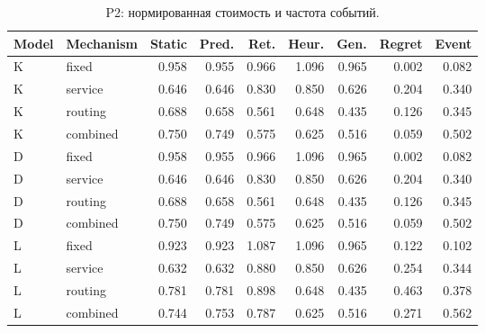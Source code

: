 \begin{table}[htbp]\caption{P2: нормированная стоимость и частота событий.}\centering\small\setlength{\tabcolsep}{3pt}

\begin{tabular}{llrrrrrrr}\toprule

Model & Mechanism & Static & Pred. & Ret. & Heur. & Gen. & Regret & Event\\\midrule

K & fixed & 0.958 & 0.955 & 0.966 & 1.096 & 0.965 & 0.002 & 0.082\\

K & service & 0.646 & 0.646 & 0.830 & 0.850 & 0.626 & 0.204 & 0.340\\

K & routing & 0.688 & 0.658 & 0.561 & 0.648 & 0.435 & 0.126 & 0.345\\

K & combined & 0.750 & 0.749 & 0.575 & 0.625 & 0.516 & 0.059 & 0.502\\

D & fixed & 0.958 & 0.955 & 0.966 & 1.096 & 0.965 & 0.002 & 0.082\\

D & service & 0.646 & 0.646 & 0.830 & 0.850 & 0.626 & 0.204 & 0.340\\

D & routing & 0.688 & 0.658 & 0.561 & 0.648 & 0.435 & 0.126 & 0.345\\

D & combined & 0.750 & 0.749 & 0.575 & 0.625 & 0.516 & 0.059 & 0.502\\

L & fixed & 0.923 & 0.923 & 1.087 & 1.096 & 0.965 & 0.122 & 0.102\\

L & service & 0.632 & 0.632 & 0.880 & 0.850 & 0.626 & 0.254 & 0.344\\

L & routing & 0.781 & 0.781 & 0.898 & 0.648 & 0.435 & 0.463 & 0.378\\

L & combined & 0.744 & 0.753 & 0.787 & 0.625 & 0.516 & 0.271 & 0.562\\

\bottomrule\end{tabular}\end{table}

